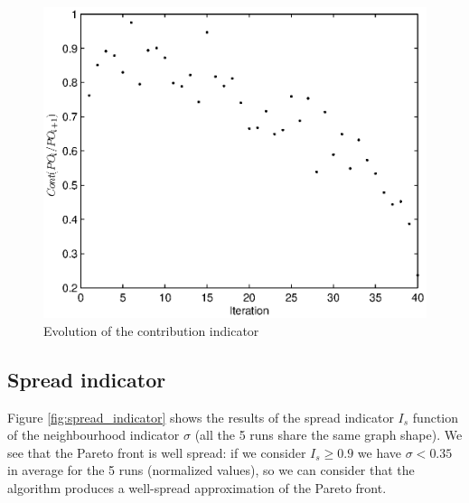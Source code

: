 \begin{figure}[h!]
\begin{center}
\includegraphics[width=1\linewidth]{contrib2new.eps}
\end{center}
\vspace{-0.5cm}
\caption{Evolution of the contribution indicator}
\label{fig:contrib}
\end{figure}

\subsection{Spread indicator}
\label{app:spread}

Figure \ref{fig:spread_indicator} shows the results of the spread indicator $I_s$ function of the neighbourhood indicator $\sigma$ (all the 5 runs share the same graph shape). We see that the Pareto front is well spread: if  we consider $I_s \geq 0.9$ we have $\sigma < 0.35$ in average for the 5 runs (normalized values), so we can consider that the algorithm produces a well-spread approximation of the Pareto front.

